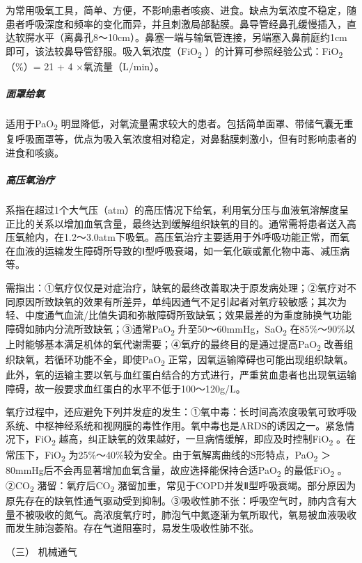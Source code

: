 为常用吸氧工具，简单、方便，不影响患者咳痰、进食。缺点为氧浓度不稳定，随患者呼吸深度和频率的变化而异，并且刺激局部黏膜。鼻导管经鼻孔缓慢插入，直达软腭水平（离鼻孔8～10cm）。鼻塞一端与输氧管连接，另端塞入鼻前庭约1cm即可，该法较鼻导管舒服。吸入氧浓度（FiO\textsubscript{2}
）的计算可参照经验公式：FiO\textsubscript{2} （\%）= 21 + 4
×氧流量（L/min）。

\subparagraph{面罩给氧}

适用于PaO\textsubscript{2}
明显降低，对氧流量需求较大的患者。包括简单面罩、带储气囊无重复呼吸面罩等，优点为吸入氧浓度相对稳定，对鼻黏膜刺激小，但有时影响患者的进食和咳痰。

\subparagraph{高压氧治疗}

系指在超过1个大气压（atm）的高压情况下给氧，利用氧分压与血液氧溶解度呈正比的关系以增加血氧含量，最终达到缓解组织缺氧的目的。通常需将患者送入高压氧舱内，在1.2～3.0atm下吸氧。高压氧治疗主要适用于外呼吸功能正常，而氧在血液的运输发生障碍所导致的Ⅰ型呼吸衰竭，如一氧化碳或氰化物中毒、减压病等。

需指出：①氧疗仅仅是对症治疗，缺氧的最终改善取决于原发病处理；②氧疗对不同原因所致缺氧的效果有所差异，单纯因通气不足引起者对氧疗较敏感；其次为轻、中度通气血流/比值失调和弥散障碍所致缺氧；效果最差的为重度肺换气功能障碍如肺内分流所致缺氧；③通常PaO\textsubscript{2}
升至50～60mmHg，SaO\textsubscript{2}
在85\%～90\%以上时能够基本满足机体的氧代谢需要；④氧疗的最终目的是通过提高PaO\textsubscript{2}
改善组织缺氧，若循环功能不全，即使PaO\textsubscript{2}
正常，因氧运输障碍也可能出现组织缺氧。此外，氧的运输主要以氧与血红蛋白结合的方式进行，严重贫血患者也出现氧运输障碍，故一般要求血红蛋白的水平不低于100～120g/L。

氧疗过程中，还应避免下列并发症的发生：①氧中毒：长时间高浓度吸氧可致呼吸系统、中枢神经系统和视网膜的毒性作用。氧中毒也是ARDS的诱因之一。紧急情况下，FiO\textsubscript{2}
越高，纠正缺氧的效果越好，一旦病情缓解，即应及时控制FiO\textsubscript{2}
。在常压下，FiO\textsubscript{2}
为25\%～40\%较为安全。由于氧解离曲线的S形特点，PaO\textsubscript{2} ＞
80mmHg后不会再显著增加血氧含量，故应选择能保持合适PaO\textsubscript{2}
的最低FiO\textsubscript{2} 。②CO\textsubscript{2}
潴留：氧疗后CO\textsubscript{2}
潴留加重，常见于COPD并发Ⅱ型呼吸衰竭。部分原因为原先存在的缺氧性通气驱动受到抑制。③吸收性肺不张：呼吸空气时，肺内含有大量不被吸收的氮气。高浓度氧疗时，肺泡气中氮逐渐为氧所取代，氧易被血液吸收而发生肺泡萎陷。存在气道阻塞时，易发生吸收性肺不张。

\hypertarget{text00076.htmlux5cux23CHP3-4-3-1-3}{}
（三） 机械通气

